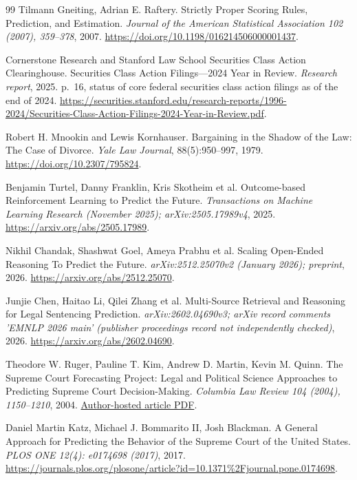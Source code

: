 \documentclass[11pt]{article}
\begin{document}
\begin{thebibliography}{99}
 Tilmann Gneiting, Adrian E. Raftery. Strictly Proper Scoring Rules, Prediction, and Estimation. \emph{Journal of the American Statistical Association 102 (2007), 359--378}, 2007. \url{https://doi.org/10.1198/016214506000001437}.

 Cornerstone Research and Stanford Law School Securities Class Action Clearinghouse. Securities Class Action Filings---2024 Year in Review. \emph{Research report}, 2025. p.~16, status of core federal securities class action filings as of the end of 2024. \url{https://securities.stanford.edu/research-reports/1996-2024/Securities-Class-Action-Filings-2024-Year-in-Review.pdf}.

 Robert H. Mnookin and Lewis Kornhauser. Bargaining in the Shadow of the Law: The Case of Divorce. \emph{Yale Law Journal}, 88(5):950--997, 1979. \url{https://doi.org/10.2307/795824}.

 Benjamin Turtel, Danny Franklin, Kris Skotheim et al. Outcome-based Reinforcement Learning to Predict the Future. \emph{Transactions on Machine Learning Research (November 2025); arXiv:2505.17989v4}, 2025. \url{https://arxiv.org/abs/2505.17989}.

 Nikhil Chandak, Shashwat Goel, Ameya Prabhu et al. Scaling Open-Ended Reasoning To Predict the Future. \emph{arXiv:2512.25070v2 (January 2026); preprint}, 2026. \url{https://arxiv.org/abs/2512.25070}.

 Junjie Chen, Haitao Li, Qilei Zhang et al. Multi-Source Retrieval and Reasoning for Legal Sentencing Prediction. \emph{arXiv:2602.04690v3; arXiv record comments 'EMNLP 2026 main' (publisher proceedings record not independently checked)}, 2026. \url{https://arxiv.org/abs/2602.04690}.

 Theodore W. Ruger, Pauline T. Kim, Andrew D. Martin, Kevin M. Quinn. The Supreme Court Forecasting Project: Legal and Political Science Approaches to Predicting Supreme Court Decision-Making. \emph{Columbia Law Review 104 (2004), 1150--1210}, 2004. \href{https://andrewdmartin.wustl.edu/app/uploads/2019/01/The-Supreme-Court-Forecasting-Project-Legal-and-Political-Science-Approaches-to-Predicting-Supreme-Court-Decision-Making-2bvpcdb.pdf}{Author-hosted article PDF}.

 Daniel Martin Katz, Michael J. Bommarito II, Josh Blackman. A General Approach for Predicting the Behavior of the Supreme Court of the United States. \emph{PLOS ONE 12(4): e0174698 (2017)}, 2017. \url{https://journals.plos.org/plosone/article?id=10.1371%2Fjournal.pone.0174698}.


\end{thebibliography}
\end{document}

